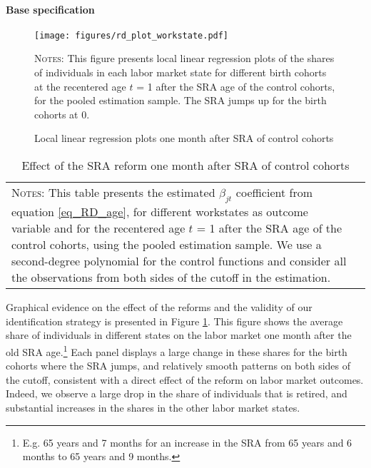 \documentclass[12pt,a4paper]{article}
\begin{document}
\paragraph{Base specification}

\begin{figure}[!t]
\caption{Local linear regression plots one month after SRA of control cohorts}
\begin{adjustwidth}{-1in}{-1in}	
\label{rd_plot_workstate}
\centering
\texttt{[image: figures/rd\_plot\_workstate.pdf]}
\end{adjustwidth}
\begin{minipage}{15cm}%
  \scriptsize
	\textsc{Notes:} This figure presents local linear regression plots of the shares of individuals in each labor market state for different birth cohorts at the recentered age $t$ = 1 after the SRA age of the control cohorts, for the pooled estimation sample. The SRA jumps up for the birth cohorts at 0.
	\end{minipage}%
\end{figure}
\begin{table}[!h]	
\caption{Effect of the SRA reform one month after SRA of control cohorts}
\footnotesize
\label{table_RD_workstate}
\begin{adjustbox}{max width = \textwidth, max totalheight=.7\textheight, keepaspectratio}
\hspace*{-1cm}

\hspace*{-1cm}
\end{adjustbox}
\vspace*{0.2cm}
\scriptsize
\begin{tabular}{ll}
\begin{minipage}{13cm}%
	\textsc{Notes:}  This table presents the estimated $\beta_{jt}$ coefficient from equation \ref{eq_RD_age}, for different workstates as outcome variable and for the recentered age $t$ = 1 after the SRA age of the control cohorts, using the pooled estimation sample. We use a second-degree polynomial for the control functions and consider all the observations from both sides of the cutoff in the estimation. 
\end{minipage}%
\end{tabular}
\normalsize
\end{table}

Graphical evidence on the effect of the reforms and the validity of our identification strategy is presented in Figure \ref{rd_plot_workstate}. This figure shows the average share of individuals in different states on the labor market one month after the old SRA age.\footnote{E.g. 65 years and 7 months for an increase in the SRA from 65 years and 6 months to 65 years and 9 months.} Each panel displays a large change in these shares for the birth cohorts where the SRA jumps, and relatively smooth patterns on both sides of the cutoff, consistent with a direct effect of the reform on labor market outcomes. Indeed, we observe a large drop in the share of individuals that is retired, and substantial increases in the shares in the other labor market states.
\end{document}
